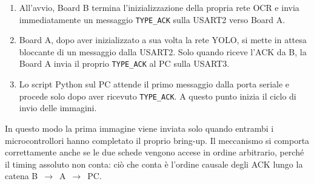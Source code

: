 \begin{enumerate}
    \item All'avvio, Board B termina l'inizializzazione della propria rete OCR e invia immediatamente un messaggio \texttt{TYPE\_ACK} sulla USART2 verso Board A.
    \item Board A, dopo aver inizializzato a sua volta la rete YOLO, si mette in attesa bloccante di un messaggio dalla USART2. Solo quando riceve l'ACK da B, la Board A invia il proprio \texttt{TYPE\_ACK} al PC sulla USART3.
    \item Lo script Python sul PC attende il primo messaggio dalla porta seriale e procede solo dopo aver ricevuto \texttt{TYPE\_ACK}. A questo punto inizia il ciclo di invio delle immagini.
\end{enumerate}

In questo modo la prima immagine viene inviata solo quando entrambi i microcontrollori hanno completato il proprio bring-up. Il meccanismo si comporta correttamente anche se le due schede vengono accese in ordine arbitrario, perché il timing assoluto non conta: ciò che conta è l'ordine causale degli ACK lungo la catena B~$\rightarrow$~A~$\rightarrow$~PC.
